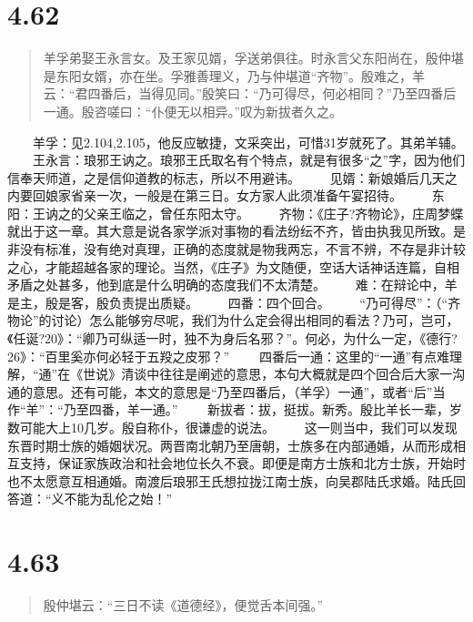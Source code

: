\documentclass[]{book}
\begin{document}
\section{4.62}\label{section-239}

\begin{quote}
羊孚弟娶王永言女。及王家见婿，孚送弟俱往。时永言父东阳尚在，殷仲堪是东阳女婿，亦在坐。孚雅善理义，乃与仲堪道``齐物''。殷难之，羊云：``君四番后，当得见同。''殷笑曰：``乃可得尽，何必相同？''乃至四番后一通。殷咨嗟曰：``仆便无以相异。''叹为新拔者久之。
\end{quote}

　　羊孚：见2.104,2.105，他反应敏捷，文采突出，可惜31岁就死了。其弟羊辅。
　　王永言：琅邪王讷之。琅邪王氏取名有个特点，就是有很多``之''字，因为他们信奉天师道，之是信仰道教的标志，所以不用避讳。
　　见婿：新娘婚后几天之内要回娘家省亲一次，一般是在第三日。女方家人此须准备午宴招待。
　　东阳：王讷之的父亲王临之，曾任东阳太守。
　　齐物：《庄子?齐物论》，庄周梦蝶就出于这一章。其大意是说各家学派对事物的看法纷纭不齐，皆由执我见所致。是非没有标准，没有绝对真理，正确的态度就是物我两忘，不言不辨，不存是非计较之心，才能超越各家的理论。当然，《庄子》为文随便，空话大话神话连篇，自相矛盾之处甚多，他到底是什么明确的态度我们不太清楚。
　　难：在辩论中，羊是主，殷是客，殷负责提出质疑。 　　四番：四个回合。
　　``乃可得尽''：（``齐物论''的讨论）怎么能够穷尽呢，我们为什么定会得出相同的看法？乃可，岂可，《任诞?20》：``卿乃可纵适一时，独不为身后名邪？''。何必，为什么一定，《德行?26》：``百里奚亦何必轻于五羖之皮邪？''
　　四番后一通：这里的``一通''有点难理解，``通''在《世说》清谈中往往是阐述的意思，本句大概就是四个回合后大家一沟通的意思。还有可能，本文的意思是``乃至四番后，（羊孚）一通''，或者``后''当作``羊''：``乃至四番，羊一通。''
　　新拔者：拔，挺拔。新秀。殷比羊长一辈，岁数可能大上10几岁。殷自称仆，很谦虚的说法。
　　这一则当中，我们可以发现东晋时期士族的婚姻状况。两晋南北朝乃至唐朝，士族多在内部通婚，从而形成相互支持，保证家族政治和社会地位长久不衰。即便是南方士族和北方士族，开始时也不太愿意互相通婚。南渡后琅邪王氏想拉拢江南士族，向吴郡陆氏求婚。陆氏回答道：``义不能为乱伦之始！''

\section{4.63}\label{section-240}

\begin{quote}
殷仲堪云：``三日不读《道德经》，便觉舌本间强。''
\end{quote}
\end{document}

